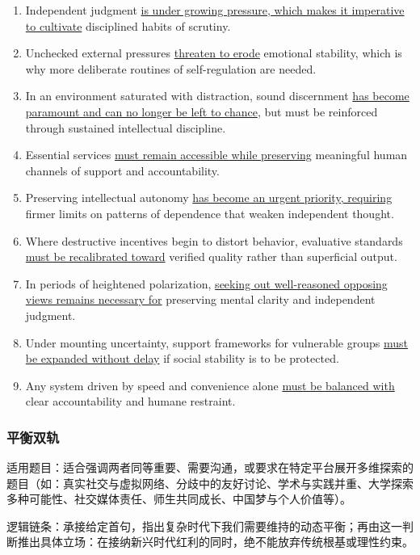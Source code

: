\begin{enumerate}
    \item Independent judgment \underline{is under growing pressure, which makes it imperative to cultivate} disciplined habits of scrutiny.
    \item Unchecked external pressures \underline{threaten to erode} emotional stability, which is why more deliberate routines of self-regulation are needed.
    \item In an environment saturated with distraction, sound discernment \underline{has become paramount and can no longer be left to chance}, but must be reinforced through sustained intellectual discipline.
    \item Essential services \underline{must remain accessible while preserving} meaningful human channels of support and accountability.
    \item Preserving intellectual autonomy \underline{has become an urgent priority, requiring} firmer limits on patterns of dependence that weaken independent thought.
    \item Where destructive incentives begin to distort behavior, evaluative standards \underline{must be recalibrated toward} verified quality rather than superficial output.
    \item In periods of heightened polarization, \underline{seeking out well-reasoned opposing views remains necessary for} preserving mental clarity and independent judgment.
    \item Under mounting uncertainty, support frameworks for vulnerable groups \underline{must be expanded without delay} if social stability is to be protected.
    \item Any system driven by speed and convenience alone \underline{must be balanced with} clear accountability and humane restraint.
\end{enumerate}

\subsubsection{平衡双轨}

适用题目：适合强调两者同等重要、需要沟通，或要求在特定平台展开多维探索的题目（如：真实社交与虚拟网络、分歧中的友好讨论、学术与实践并重、大学探索多种可能性、社交媒体责任、师生共同成长、中国梦与个人价值等）。

逻辑链条：承接给定首句，指出复杂时代下我们需要维持的动态平衡；再由这一判断推出具体立场：在接纳新兴时代红利的同时，绝不能放弃传统根基或理性约束。

